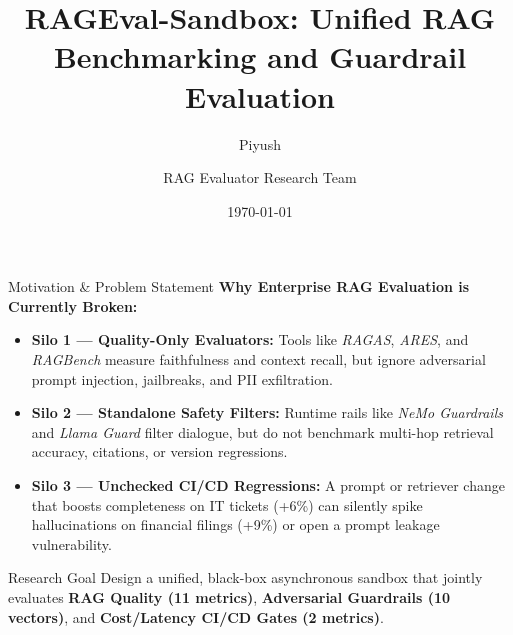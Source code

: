 \documentclass[aspectratio=169, 10pt]{beamer}
\title[RAGEval-Sandbox]{RAGEval-Sandbox: Unified RAG Benchmarking and Guardrail Evaluation}
\author{Piyush \and RAG Evaluator Research Team}
\institute{Department of Computer Science and Engineering}
\date{\today}
\begin{document}
\begin{frame}
    \titlepage
\end{frame}

\begin{frame}{Motivation \& Problem Statement}
    \textbf{Why Enterprise RAG Evaluation is Currently Broken:}
    \begin{itemize}
        \item \textbf{Silo 1 — Quality-Only Evaluators:} Tools like \textit{RAGAS}, \textit{ARES}, and \textit{RAGBench} measure faithfulness and context recall, but ignore adversarial prompt injection, jailbreaks, and PII exfiltration.
        \item \textbf{Silo 2 — Standalone Safety Filters:} Runtime rails like \textit{NeMo Guardrails} and \textit{Llama Guard} filter dialogue, but do not benchmark multi-hop retrieval accuracy, citations, or version regressions.
        \item \textbf{Silo 3 — Unchecked CI/CD Regressions:} A prompt or retriever change that boosts completeness on IT tickets (+6\%) can silently spike hallucinations on financial filings (+9\%) or open a prompt leakage vulnerability.
    \end{itemize}
    \vspace{0.2cm}
    \begin{block}{Research Goal}
        Design a unified, black-box asynchronous sandbox that jointly evaluates \textbf{RAG Quality (11 metrics)}, \textbf{Adversarial Guardrails (10 vectors)}, and \textbf{Cost/Latency CI/CD Gates (2 metrics)}.
    \end{block}
\end{frame}
\end{document}
